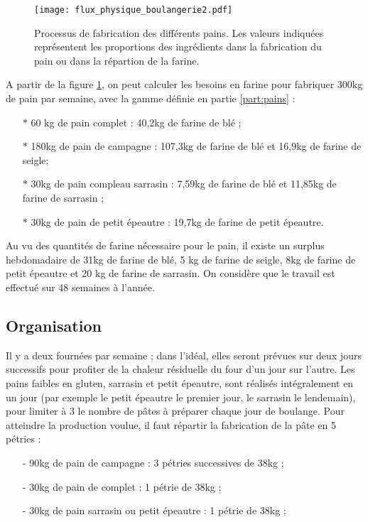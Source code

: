 \documentclass{book}
\begin{document}
\begin{figure}[h!]
\begin{center}
	\texttt{[image: flux\_physique\_boulangerie2.pdf]}
	\caption{Processus de fabrication des différents pains. Les valeurs indiquées représentent les proportions des ingrédients dans la fabrication du pain ou dans la répartion de la farine.}
	\label{fig:flux_boulange}
\end{center}
\end{figure}


A partir de la figure \ref{fig:flux_boulange}, on peut calculer les besoins en farine pour fabriquer 300kg de pain par semaine, avec la gamme définie en partie \ref{part:pains} : 
\begin{itemize}

	\item[$\ast$] 60 kg de pain complet : 40,2kg de farine de blé ;
	\item[$\ast$] 180kg de pain de campagne : 107,3kg de farine de blé et 16,9kg de farine de seigle;
	\item[$\ast$] 30kg de pain compleau sarrasin : 7,59kg de farine de blé et 11,85kg de farine de sarrasin ;
	\item[$\ast$] 30kg de pain de petit épeautre : 19,7kg de farine de petit épeautre.

\end{itemize}

Au vu des quantités de farine nécessaire pour le pain, il existe un surplus hebdomadaire de 31kg de farine de blé, 5 kg de farine de seigle, 8kg de farine de petit épeautre et 20 kg de farine de sarrasin. On considère que le travail est effectué sur 48 semaines à l'année.

\subsection{Organisation}

Il y a deux fournées par semaine ; dans l'idéal, elles seront prévues sur deux jours successifs pour profiter de la chaleur résiduelle du four d'un jour sur l'autre. Les pains faibles en gluten, sarrasin et petit épeautre, sont réalisés intégralement en un jour (par exemple le petit épeautre le premier jour, le sarrasin le lendemain), pour limiter à 3 le nombre de pâtes à préparer chaque jour de boulange. Pour atteindre la production voulue, il faut répartir la fabrication de la pâte en 5 pétries :
\begin{itemize}

	\item[-] 90kg de pain de campagne : 3 pétries successives de 38kg ;
	\item[-] 30kg de pain de complet : 1 pétrie de 38kg ;
	\item[-] 30kg de pain sarrasin ou petit épeautre : 1 pétrie de 38kg ;

\end{itemize}
\end{document}
